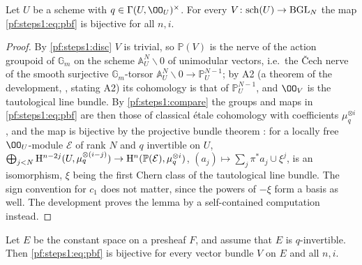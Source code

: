 \begin{lemma}\label{pf:steps1:pbfsch}
Let $U$ be a scheme with $q\in\Gamma(U,\OO_U)^\times$. For every $V\colon\mathrm{sch}(U)\to\mathrm{BGL}_N$ the map
\eqref{pf:steps1:eq:pbf} is bijective for all $n,i$.
\end{lemma}

\begin{proof}
By \cref{pf:steps1:disc} $V$ is trivial, so $\mathbb P(V)$ is the nerve of the action groupoid of
$\mathbb G_m$ on the scheme $\mathbb A^N_U\smallsetminus0$ of unimodular vectors, i.e.\ the \v{C}ech nerve of the
smooth surjective $\mathbb G_m$-torsor $\mathbb A^N_U\smallsetminus0\to\mathbb P^{N-1}_U$; by A2 (a theorem of the
development, , stating A2) its cohomology is that of $\mathbb P^{N-1}_U$, and
$\OO_V$ is the tautological line bundle. By \cref{pf:steps1:compare} the groups and maps in \eqref{pf:steps1:eq:pbf} are
then those of classical \'etale cohomology with coefficients $\mu_q^{\otimes i}$, and the map is bijective by the
projective bundle theorem \cite[Exp.~VII, Th.~2.2.1]{Grothendieck1977}: for a locally free $\OO_U$-module $\mathcal E$ of
rank $N$ and $q$ invertible on $U$, $\bigoplus_{j<N}\mathrm{H}^{n-2j}(U,\mu_q^{\otimes(i-j)})\to
\mathrm{H}^n(\mathbb P(\mathcal E),\mu_q^{\otimes i})$, $(a_j)\mapsto\sum_j\pi^*a_j\cup\xi^j$, is an isomorphism, $\xi$ being
the first Chern class of the tautological line bundle. The sign convention for $c_1$ does not matter, since the powers of
$-\xi$ form a basis as well. The development proves the lemma by a self-contained computation instead.
\end{proof}

\begin{lemma}\label{pf:steps1:pbfdisc}
Let $E$ be the constant space on a presheaf $F$, and assume that $E$ is $q$-invertible. Then
\eqref{pf:steps1:eq:pbf} is bijective for every vector bundle $V$ on $E$ and all $n,i$.
\end{lemma}

